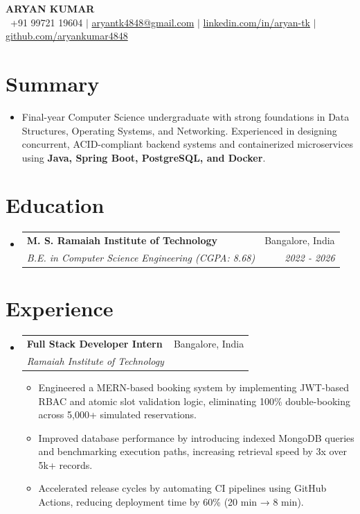 \documentclass[letterpaper,11pt]{article}
\makeatletter
\newcommand{\resumeItem}[1]{
  \item\small{#1 \vspace{-3pt}}
}
\newcommand{\resumeSubheading}[4]{
  \vspace{-3pt}\item
    \begin{tabular*}{0.97\textwidth}[t]{l@{\extracolsep{\fill}}r}
      \textbf{#1} & #2 \\
      \textit{\small#3} & \textit{\small #4} \\
    \end{tabular*}\vspace{-8pt}
}
\newcommand{\resumeSubHeadingListStart}{\begin{itemize}[leftmargin=0.12in, label={}]}
\newcommand{\resumeSubHeadingListEnd}{\end{itemize}}
\newcommand{\resumeItemListStart}{\begin{itemize}[leftmargin=0.2in]}
\newcommand{\resumeItemListEnd}{\end{itemize}\vspace{-8pt}}
\makeatother
\begin{document}
\begin{center}
    \textbf{\Huge \scshape ARYAN KUMAR} \\ \vspace{2pt}
    \small 
    \faPhone\ +91 99721 19604 $|$
    \href{mailto:aryantk4848@gmail.com}{aryantk4848@gmail.com} $|$
    \href{https://linkedin.com/in/aryan-tk/}{linkedin.com/in/aryan-tk} $|$
    \href{https://github.com/aryankumar4848}{github.com/aryankumar4848}
\end{center}

\section{Summary}
\resumeSubHeadingListStart
\resumeItem{
Final-year Computer Science undergraduate with strong foundations in Data Structures, Operating Systems, and Networking. Experienced in designing concurrent, ACID-compliant backend systems and containerized microservices using \textbf{Java, Spring Boot, PostgreSQL, and Docker}.
}
\resumeSubHeadingListEnd

\section{Education}
\resumeSubHeadingListStart
  \resumeSubheading
    {M. S. Ramaiah Institute of Technology}{Bangalore, India}
    {B.E. in Computer Science Engineering (CGPA: 8.68)}{2022 - 2026}
\resumeSubHeadingListEnd

\section{Experience}
\resumeSubHeadingListStart
  \resumeSubheading
    {Full Stack Developer Intern}{Bangalore, India}
    {Ramaiah Institute of Technology}{}
    \resumeItemListStart
    \resumeItem{Engineered a MERN-based booking system by implementing JWT-based RBAC and atomic slot validation logic, eliminating 100\% double-booking across 5,000+ simulated reservations.}
    \resumeItem{Improved database performance by introducing indexed MongoDB queries and benchmarking execution paths, increasing retrieval speed by 3x over 5k+ records.}
    \resumeItem{Accelerated release cycles by automating CI pipelines using GitHub Actions, reducing deployment time by 60\% (20 min → 8 min).}
    \resumeItemListEnd
\resumeSubHeadingListEnd

\end{document}
